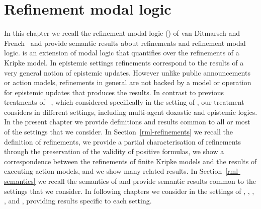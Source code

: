 \chapter{Refinement modal logic}\label{rml}

In this chapter we recall the refinement modal logic (\logicRml{}) of van Ditmarsch and French~\cite{vanditmarsch:2009} and provide semantic results about refinements and refinement modal logic.
\logicRml{} is an extension of modal logic that quantifies over the refinements of a Kripke model.
In epistemic settings refinements correspond to the results of a very general notion of epistemic updates.
However unlike public announcements or action models, refinements in general are not backed by a model or operation for epistemic updates that produces the results.  
In contrast to previous treatments of \logicRml{}~\cite{vanditmarsch:2009,vanditmarsch:2010}, which considered \logicRml{} specifically in the setting of \classK{}, our treatment considers \logicRml{} in different settings, including multi-agent doxastic and epistemic logics.
In the present chapter we provide definitions and results common to all or most of the settings that we consider.
In Section~\ref{rml-refinements} we recall the definition of refinements, we provide a partial characterisation of refinements through the preservation of the validity of positive formulas, we show a correspondence between the refinements of finite Kripke models and the results of executing action models, and we show many related results.
In Section~\ref{rml-semantics} we recall the semantics of \logicRml{} and provide semantic results common to the settings that we consider.
In following chapters we consider \logicRml{} in the settings of \classK{}, \classKFF{}, \classKD{}, \classS{}, and \classKF{}, providing results specific to each setting.



